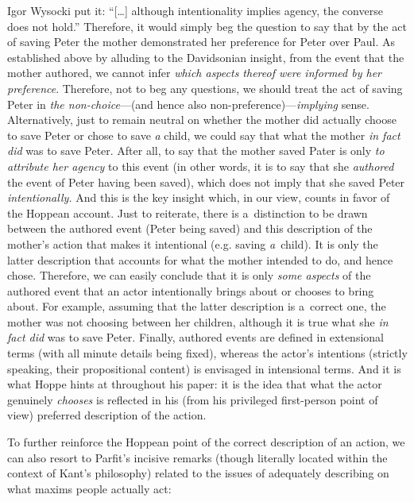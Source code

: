 \begin{artengenv}{Igor Wysocki}
 put it: ``[…] although intentionality implies agency, the converse does not hold.'' Therefore, it would simply beg the question to say that by the act of saving Peter the mother demonstrated her preference for Peter over Paul. As established above by alluding to the Davidsonian insight, from the event that the mother authored, we cannot infer \textit{which aspects thereof were informed by her preference}. Therefore, not to beg any questions, we should treat the act of saving Peter in \textit{the non-choice}---(and hence also non-preference)---\textit{implying} sense. Alternatively, just to remain neutral on whether the mother did actually choose to save Peter or chose to save \textit{a} child, we could say that what the mother \textit{in fact did} was to save Peter. After all, to say that the mother saved Pater is only \textit{to attribute her agency} to this event (in other words, it is to say that she \textit{authored} the event of Peter having been saved), which does not imply that she saved Peter \textit{intentionally.} And this is the key insight which, in our view, counts in favor of the Hoppean account. Just to reiterate, there is a~distinction to be drawn between the authored event (Peter being saved) and this description of the mother's action that makes it intentional (e.g. saving \textit{a}~child). It is only the latter description that accounts for what the mother intended to do, and hence chose. Therefore, we can easily conclude that it is only \textit{some aspects} of the authored event that an actor intentionally brings about or chooses to bring about. For example, assuming that the latter description is a~correct one, the mother was not choosing between her children, although it is true what she \textit{in fact did} was to save Peter. Finally, authored events are defined in extensional terms (with all minute details being fixed), whereas the actor's intentions (strictly speaking, their propositional content) is envisaged in intensional terms. And it is what Hoppe 
\parencite*[][]{hoppe_must_2005} %
 hints at throughout his paper: it is the idea that what the actor genuinely \textit{chooses} is reflected in his (from his privileged first-person point of view) preferred description of the action.

To further reinforce the Hoppean point of the correct description of an action, we can also resort to Parfit's
\parencite*[][p.289]{parfit_what_2011} %
 incisive remarks (though literally located within the context of Kant's philosophy) related to the issues of adequately describing on what maxims people actually act:


\end{artengenv}
